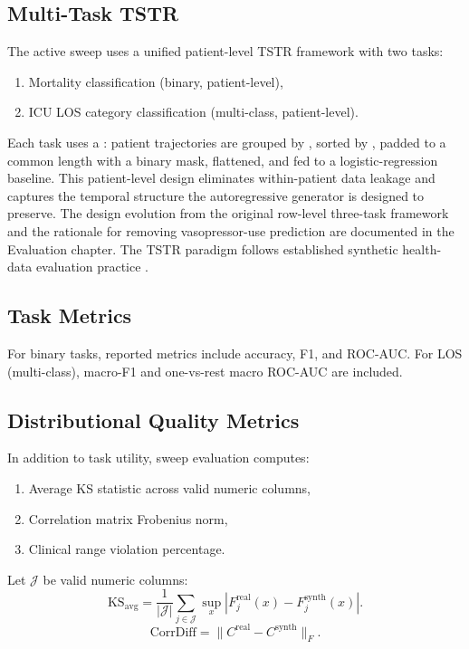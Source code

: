 \subsection{Multi-Task TSTR}

The active sweep uses a unified patient-level TSTR framework with two tasks:
\begin{enumerate}\tightlist
    \item Mortality classification (binary, patient-level),
    \item ICU LOS category classification (multi-class, patient-level).
\end{enumerate}

Each task uses a : patient trajectories are grouped by , sorted by , padded to a common length with a binary mask, flattened, and fed to a logistic-regression baseline. This patient-level design eliminates within-patient data leakage and captures the temporal structure the autoregressive generator is designed to preserve. The design evolution from the original row-level three-task framework and the rationale for removing vasopressor-use prediction are documented in the Evaluation chapter. The TSTR paradigm follows established synthetic health-data evaluation practice \cite{esteban2018rcgan}.

\subsection{Task Metrics}

For binary tasks, reported metrics include accuracy, F1, and ROC-AUC.
For LOS (multi-class), macro-F1 and one-vs-rest macro ROC-AUC are included.

\subsection{Distributional Quality Metrics}

In addition to task utility, sweep evaluation computes:
\begin{enumerate}\tightlist
    \item Average KS statistic across valid numeric columns,
    \item Correlation matrix Frobenius norm,
    \item Clinical range violation percentage.
\end{enumerate}

Let $\mathcal{J}$ be valid numeric columns:
\begin{equation}
\text{KS}_{\text{avg}} = \frac{1}{|\mathcal{J}|}\sum_{j\in\mathcal{J}}\sup_x |F_j^{\text{real}}(x)-F_j^{\text{synth}}(x)|.
\end{equation}
\begin{equation}
\text{CorrDiff} = \|C^{\text{real}} - C^{\text{synth}}\|_F.
\end{equation}

